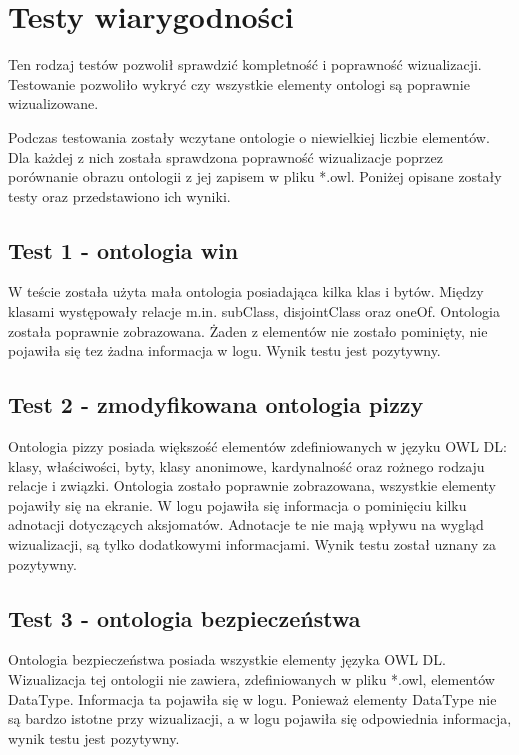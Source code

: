 \section{Testy wiarygodności}
Ten rodzaj testów pozwolił sprawdzić kompletność i poprawność wizualizacji.  Testowanie pozwoliło wykryć  czy wszystkie elementy ontologi są poprawnie wizualizowane. 
\par 
Podczas testowania zostały wczytane ontologie o niewielkiej liczbie elementów. Dla każdej z nich została sprawdzona poprawność wizualizacje poprzez porównanie obrazu 
ontologii z jej zapisem w pliku *.owl. Poniżej opisane zostały testy oraz przedstawiono ich wyniki.

\subsection*{Test 1 - ontologia win}
W teście została użyta mała ontologia posiadająca kilka klas i bytów. Między klasami występowały relacje m.in. subClass, disjointClass oraz oneOf. Ontologia została 
poprawnie zobrazowana. Żaden z elementów nie zostało pominięty, nie pojawiła się tez żadna informacja w logu. Wynik testu jest pozytywny. 

\subsection*{Test 2 - zmodyfikowana ontologia pizzy}
Ontologia pizzy posiada większość elementów zdefiniowanych w języku OWL DL: klasy, właściwości, byty, klasy anonimowe, kardynalność oraz rożnego rodzaju relacje i związki. 
Ontologia zostało poprawnie zobrazowana, wszystkie elementy pojawiły się na ekranie. W logu pojawiła się informacja o pominięciu kilku adnotacji dotyczących aksjomatów. 
Adnotacje te nie mają wpływu na wygląd wizualizacji, są tylko dodatkowymi informacjami. Wynik testu został uznany za pozytywny. 

\subsection*{Test 3 - ontologia bezpieczeństwa}
Ontologia bezpieczeństwa posiada wszystkie elementy języka OWL DL. Wizualizacja tej ontologii nie zawiera, zdefiniowanych w pliku *.owl, elementów DataType. Informacja 
ta pojawiła się w logu. Ponieważ elementy DataType nie są bardzo istotne przy wizualizacji, a w logu pojawiła się odpowiednia informacja, wynik testu jest pozytywny. 



